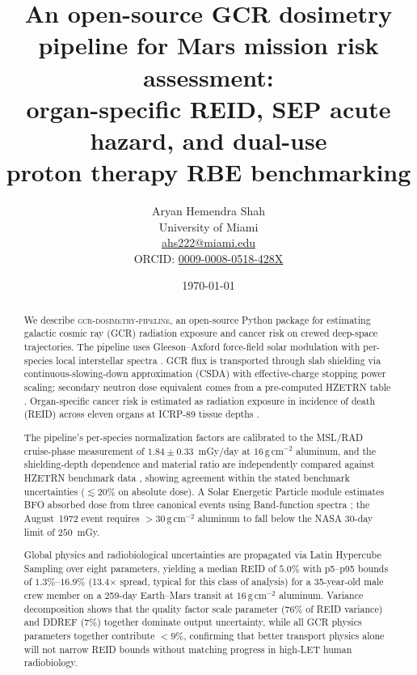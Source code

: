 \documentclass[12pt,letterpaper]{article}
\title{An open-source GCR dosimetry pipeline for Mars mission risk assessment:\\
       organ-specific REID, SEP acute hazard, and dual-use\\
       proton therapy RBE benchmarking}
\author{Aryan Hemendra Shah\\[4pt]
  \small University of Miami\\
  \small \href{mailto:ahs222@miami.edu}{ahs222@miami.edu}\\
  \small ORCID: \href{https://orcid.org/0009-0008-0518-428X}{0009-0008-0518-428X}
}
\date{\today}
\newcommand{\gcm}{\,\mathrm{g\,cm^{-2}}}
\begin{document}
\maketitle

\begin{abstract}

We describe \textsc{gcr-dosimetry-pipeline}, an open-source Python package for
estimating galactic cosmic ray (GCR) radiation exposure and cancer risk on
crewed deep-space trajectories.
The pipeline uses Gleeson--Axford force-field solar modulation \citep{gleeson1968}
with per-species local interstellar spectra \citep{vos2015, boschini2020}.
GCR flux is transported through slab shielding via continuous-slowing-down
approximation (CSDA) with effective-charge stopping power scaling; secondary
neutron dose equivalent comes from a pre-computed HZETRN table \citep{slaba2014}.
Organ-specific cancer risk is estimated as radiation exposure in incidence of
death (REID) across eleven organs at ICRP-89 tissue depths \citep{cucinotta2013}.

The pipeline's per-species normalization factors are calibrated to the
MSL/RAD cruise-phase measurement of $1.84 \pm 0.33$~mGy/day
\citep{zeitlin2013} at $16\gcm$ aluminum, and the shielding-depth
dependence and material ratio are independently compared against HZETRN
benchmark data \citep{slaba2014, mrigakshi2013}, showing agreement within
the stated benchmark uncertainties ($\lesssim 20\%$ on absolute dose).
A Solar Energetic Particle module estimates BFO absorbed dose from three
canonical events using Band-function spectra \citep{tylka2006};
the August~1972 event requires $>30\gcm$ aluminum to fall below the
NASA 30-day limit of $250$~mGy.

Global physics and radiobiological uncertainties are propagated via Latin
Hypercube Sampling over eight parameters, yielding a median REID of $5.0\%$ with p5--p95 bounds of $1.3\%$--$16.9\%$
(13.4$\times$ spread, typical for this class of analysis) for a 35-year-old
male crew member on a 259-day Earth--Mars transit at $16\gcm$ aluminum.
Variance decomposition shows that the quality factor scale parameter
($76\%$ of REID variance) and DDREF ($7\%$) together dominate output
uncertainty, while all GCR physics parameters together contribute $<9\%$,
confirming that better transport physics alone will not narrow REID bounds
without matching progress in high-LET human radiobiology.


\end{abstract}
\end{document}
